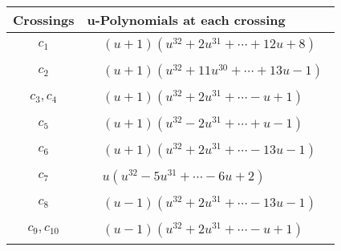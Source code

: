 \documentclass[1p]{elsarticle_modified}
\theoremstyle{definition}
\begin{document}
\begin{tabular}{m{50pt}|m{274pt}}
Crossings & \hspace{64pt}u-Polynomials at each crossing \\
\hline $$\begin{aligned}c_{1}\end{aligned}$$&$\begin{aligned}
&(u+1)(u^{32}+2 u^{31}+\cdots+12 u+8)
\end{aligned}$\\
\hline $$\begin{aligned}c_{2}\end{aligned}$$&$\begin{aligned}
&(u+1)(u^{32}+11 u^{30}+\cdots+13 u-1)
\end{aligned}$\\
\hline $$\begin{aligned}c_{3},c_{4}\end{aligned}$$&$\begin{aligned}
&(u+1)(u^{32}+2 u^{31}+\cdots- u+1)
\end{aligned}$\\
\hline $$\begin{aligned}c_{5}\end{aligned}$$&$\begin{aligned}
&(u+1)(u^{32}-2 u^{31}+\cdots+u-1)
\end{aligned}$\\
\hline $$\begin{aligned}c_{6}\end{aligned}$$&$\begin{aligned}
&(u+1)(u^{32}+2 u^{31}+\cdots-13 u-1)
\end{aligned}$\\
\hline $$\begin{aligned}c_{7}\end{aligned}$$&$\begin{aligned}
&u(u^{32}-5 u^{31}+\cdots-6 u+2)
\end{aligned}$\\
\hline $$\begin{aligned}c_{8}\end{aligned}$$&$\begin{aligned}
&(u-1)(u^{32}+2 u^{31}+\cdots-13 u-1)
\end{aligned}$\\
\hline $$\begin{aligned}c_{9},c_{10}\end{aligned}$$&$\begin{aligned}
&(u-1)(u^{32}+2 u^{31}+\cdots- u+1)
\end{aligned}$\\
\hline
\end{tabular}\newpage\renewcommand{\arraystretch}{1}
\end{document}
